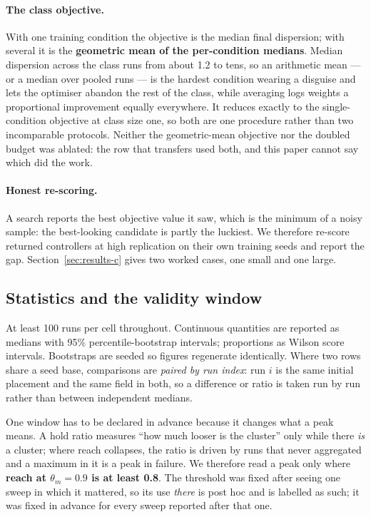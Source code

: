 \documentclass[11pt,a4paper]{article}
\begin{document}
\paragraph{The class objective.} With one training condition the objective is the
median final dispersion; with several it is the \textbf{geometric mean of the
per-condition medians}. Median dispersion across the class runs from about 1.2 to
tens, so an arithmetic mean --- or a median over pooled runs --- is the hardest
condition wearing a disguise and lets the optimiser abandon the rest of the class,
while averaging logs weights a proportional improvement equally everywhere. It
reduces exactly to the single-condition objective at class size one, so both are
one procedure rather than two incomparable protocols. Neither the geometric-mean
objective nor the doubled budget was ablated: the row that transfers used both,
and this paper cannot say which did the work.

\paragraph{Honest re-scoring.} A search reports the best objective value it saw,
which is the minimum of a noisy sample: the best-looking candidate is partly the
luckiest. We therefore re-score returned controllers at high replication on their
own training seeds and report the gap. Section~\ref{sec:results-c} gives two
worked cases, one small and one large.

\subsection{Statistics and the validity window}

At least 100 runs per cell throughout. Continuous quantities are reported as
medians with 95\% percentile-bootstrap intervals; proportions as Wilson score
intervals. Bootstraps are seeded so figures regenerate identically. Where two
rows share a seed base, comparisons are \emph{paired by run index}: run $i$ is
the same initial placement and the same field in both, so a difference or ratio
is taken run by run rather than between independent medians.

One window has to be declared in advance because it changes what a peak means. A
hold ratio measures ``how much looser is the cluster'' only while there
\emph{is} a cluster; where reach collapses, the ratio is driven by runs that
never aggregated and a maximum in it is a peak in failure. We therefore read a
peak only where \textbf{reach at $\theta_m = 0.9$ is at least 0.8}. The threshold
was fixed after seeing one sweep in which it mattered, so its use \emph{there} is
post hoc and is labelled as such; it was fixed in advance for every sweep
reported after that one.
\end{document}
